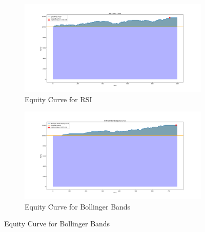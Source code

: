 \documentclass{imc-inf}
\begin{document}
			\begin{figure}[h!]
				\centering

				\begin{subfigure}{0.45\textwidth}
					\centering
					\includegraphics[width=\textwidth]{equity_curve_rsi.png}
					\caption{Equity Curve for RSI}
					\label{fig:equity_curve_rsi}
				\end{subfigure}
				\hfill
				\begin{subfigure}{0.45\textwidth}
					\centering
					\includegraphics[width=\textwidth]{equity_curve_bollinger_bands.png}
					\caption{Equity Curve for Bollinger Bands}
					\label{fig:equity_curve_bollinger_bands}
				\end{subfigure}


\end{figure}
\end{document}
